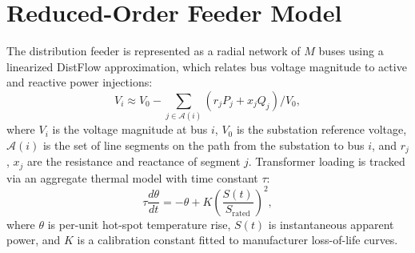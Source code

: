 \section{Reduced-Order Feeder Model}
The distribution feeder is represented as a radial network of $M$ buses using a linearized
DistFlow approximation, which relates bus voltage magnitude to active and reactive power
injections:
\begin{equation}
V_i \approx V_0 - \sum_{j \in \mathcal{A}(i)} \left( r_j P_j + x_j Q_j \right) / V_0,
\label{eq:distflow}
\end{equation}
where $V_i$ is the voltage magnitude at bus $i$, $V_0$ is the substation reference voltage,
$\mathcal{A}(i)$ is the set of line segments on the path from the substation to bus $i$, and
$r_j$, $x_j$ are the resistance and reactance of segment $j$. Transformer loading is tracked via
an aggregate thermal model with time constant $\tau$:
\begin{equation}
\tau \frac{d\theta}{dt} = -\theta + K \left( \frac{S(t)}{S_{\text{rated}}} \right)^2,
\label{eq:thermal}
\end{equation}
where $\theta$ is per-unit hot-spot temperature rise, $S(t)$ is instantaneous apparent power,
and $K$ is a calibration constant fitted to manufacturer loss-of-life curves.
